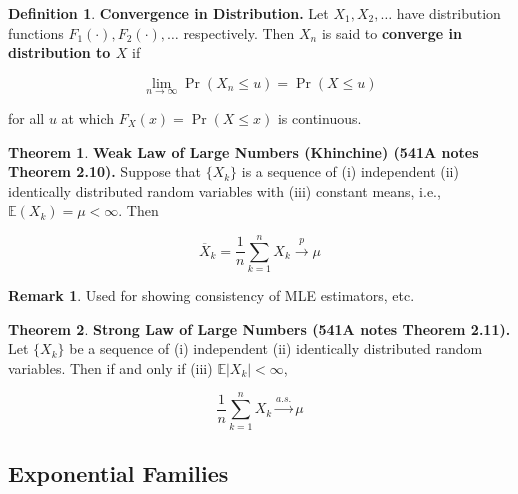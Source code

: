 \documentclass{article}
\newcommand{\E}{\mathbb{E}}
\theoremstyle{definition}
\newtheorem{theorem}{Theorem}
\theoremstyle{definition}
\theoremstyle{definition}
\theoremstyle{definition}
\theoremstyle{definition}
\newtheorem{definition}{Definition}[section]
\newtheorem*{remark}{Remark}
\theoremstyle{definition}
\theoremstyle{definition}
\begin{document}
\begin{definition}
\textbf{Convergence in Distribution.} Let \(X_1, X_2, \ldots\) have distribution functions \(F_1(\cdot), F_2(\cdot), \ldots \) respectively. Then \(X_n\) is said to \textbf{converge in distribution to \(X\)} if

\[
\lim_{n \to \infty} \Pr(X_n \leq u) = \Pr(X \leq u)
\]

for all \(u\) at which \(F_X(x) = \Pr(X \leq x)\) is continuous. 


\end{definition}

\begin{theorem}\label{asym.wlln} \textbf{Weak Law of Large Numbers (Khinchine) (541A notes Theorem 2.10).} Suppose that \(\{X_k\}\) is a sequence of (i) independent (ii) identically distributed random variables with (iii) constant means, i.e., \(\E(X_k) = \mu < \infty\). Then

\[
\overline{X}_k = \frac{1}{n} \sum_{k=1}^n X_k \xrightarrow{p} \mu
\]

\end{theorem}

\begin{remark}Used for showing consistency of MLE estimators, etc.
\end{remark}

\begin{theorem}\label{asym.lln2} \textbf{Strong Law of Large Numbers (541A notes Theorem 2.11).} Let \(\{X_k\}\) be a sequence of (i) independent (ii) identically distributed random variables. Then if and only if (iii) \(\E|X_k|  < \infty \),

\[
\frac{1}{n} \sum_{k=1}^n X_k \xrightarrow{a.s.} \mu
\]

\end{theorem}

\subsection{Exponential Families}
\end{document}
